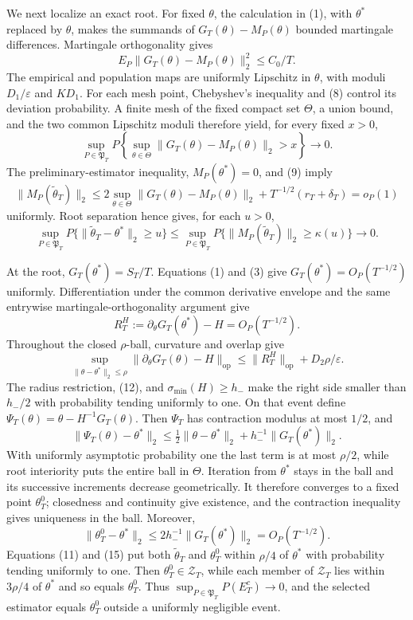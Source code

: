 We next localize an exact root. For fixed \(\theta\), the calculation in (1), with \(\theta^*\) replaced by \(\theta\), makes the summands of \(G_T(\theta)-M_P(\theta)\) bounded martingale differences. Martingale orthogonality gives
\[
 E_P\|G_T(\theta)-M_P(\theta)\|_2^2\le C_0/T.
\tag{8}
\]
The empirical and population maps are uniformly Lipschitz in \(\theta\), with moduli \(D_1/\varepsilon\) and \(KD_1\). For each mesh point, Chebyshev's inequality and (8) control its deviation probability. A finite mesh of the fixed compact set \(\Theta\), a union bound, and the two common Lipschitz moduli therefore yield, for every fixed \(x>0\),
\[
 \sup_{P\in\mathfrak P_T}P\!\left\{\sup_{\theta\in\Theta}
 \|G_T(\theta)-M_P(\theta)\|_2>x\right\}\longrightarrow0.
\tag{9}
\]
The preliminary-estimator inequality, \(M_P(\theta^*)=0\), and (9) imply
\[
 \|M_P(\widetilde\theta_T)\|_2
 \le2\sup_{\theta\in\Theta}\|G_T(\theta)-M_P(\theta)\|_2
 +T^{-1/2}(r_T+\delta_T)=o_P(1)
\tag{10}
\]
uniformly. Root separation hence gives, for each \(u>0\),
\[
 \sup_{P\in\mathfrak P_T}P\{\|\widetilde\theta_T-\theta^*\|_2\ge u\}
 \le\sup_{P\in\mathfrak P_T}P\{\|M_P(\widetilde\theta_T)\|_2
 \ge\kappa(u)\}\longrightarrow0.
\tag{11}
\]

At the root, \(G_T(\theta^*)=S_T/T\). Equations (1) and (3) give \(G_T(\theta^*)=O_P(T^{-1/2})\) uniformly. Differentiation under the common derivative envelope and the same entrywise martingale-orthogonality argument give
\[
 R_T^H:=\partial_\theta G_T(\theta^*)-H=O_P(T^{-1/2}).
\tag{12}
\]
Throughout the closed \(\rho\)-ball, curvature and overlap give
\[
 \sup_{\|\theta-\theta^*\|_2\le\rho}
 \|\partial_\theta G_T(\theta)-H\|_{\mathrm{op}}
 \le\|R_T^H\|_{\mathrm{op}}+D_2\rho/\varepsilon.
\tag{13}
\]
The radius restriction, (12), and \(\sigma_{\min}(H)\ge h_-\) make the right side smaller than \(h_-/2\) with probability tending uniformly to one. On that event define \(\Psi_T(\theta)=\theta-H^{-1}G_T(\theta)\). Then \(\Psi_T\) has contraction modulus at most \(1/2\), and
\[
 \|\Psi_T(\theta)-\theta^*\|_2
 \le\tfrac12\|\theta-\theta^*\|_2+h_-^{-1}\|G_T(\theta^*)\|_2.
\tag{14}
\]
With uniformly asymptotic probability one the last term is at most \(\rho/2\), while root interiority puts the entire ball in \(\Theta\). Iteration from \(\theta^*\) stays in the ball and its successive increments decrease geometrically. It therefore converges to a fixed point \(\theta_T^0\); closedness and continuity give existence, and the contraction inequality gives uniqueness in the ball. Moreover,
\[
 \|\theta_T^0-\theta^*\|_2
 \le2h_-^{-1}\|G_T(\theta^*)\|_2=O_P(T^{-1/2}).
\tag{15}
\]
Equations (11) and (15) put both \(\widetilde\theta_T\) and \(\theta_T^0\) within \(\rho/4\) of \(\theta^*\) with probability tending uniformly to one. Then \(\theta_T^0\in\mathcal Z_T\), while each member of \(\mathcal Z_T\) lies within \(3\rho/4\) of \(\theta^*\) and so equals \(\theta_T^0\). Thus \(\sup_{P\in\mathfrak P_T}P(E_T^c)\to0\), and the selected estimator equals \(\theta_T^0\) outside a uniformly negligible event.

